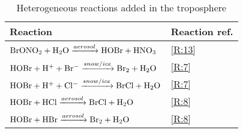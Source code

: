 \begin{table}[ht]
\centering
\begin{tabular}{|l|l|}
\hline
\textbf{Reaction}                                                                         & \textbf{Reaction ref.} \\ \hline
$\mathrm{BrONO_2} + \mathrm{H_2O} \xrightarrow{aerosol} \mathrm{HOBr} + \mathrm{HNO_3}$           & \ref{R:13}             \\
$\mathrm{HOBr} + \mathrm{H^+} + \mathrm{Br^-} \xrightarrow{snow/ice} \mathrm{Br_2} +\mathrm{H_2O} $ & \ref{R:7}              \\
$\mathrm{HOBr} + \mathrm{H^+} + \mathrm{Cl^-} \xrightarrow{snow/ice} \mathrm{BrCl} +\mathrm{H_2O} $ & \ref{R:7}              \\
$\mathrm{HOBr} + \mathrm{HCl} \xrightarrow{aerosol} \mathrm{BrCl} + \mathrm{H_2O}$                & \ref{R:8}              \\
$\mathrm{HOBr} + \mathrm{HBr} \xrightarrow{aerosol} \mathrm{Br_2} + \mathrm{H_2O}$                & \ref{R:8}              \\ \hline
\end{tabular}
\caption{Heterogeneous reactions added in the troposphere}
\label{tab:het_reactions}
\end{table}